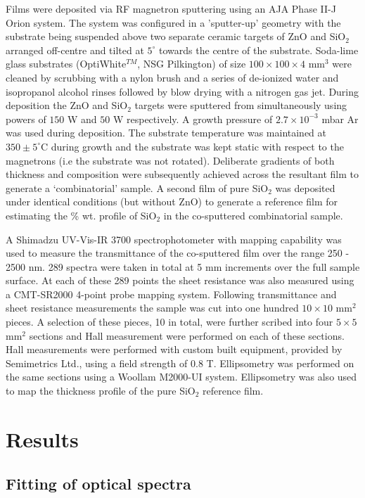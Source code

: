 \documentclass[final,5p,times]{elsarticle}
\begin{document}
Films were deposited via RF magnetron sputtering using an AJA Phase II-J Orion system. The system was configured in a 'sputter-up' geometry with the substrate being suspended above two separate ceramic targets of ZnO and SiO$_2$ arranged off-centre and tilted at $5^{\circ}$ towards the centre of the substrate.  Soda-lime glass substrates (OptiWhite$^{TM}$, NSG Pilkington) of size $100\times100\times4$ mm$^{3}$ were cleaned by scrubbing with a nylon brush and a series of de-ionized water and isopropanol alcohol rinses followed by blow drying with a nitrogen gas jet. During deposition the ZnO and SiO$_2$ targets were sputtered from simultaneously using powers of $150$ W and $50$ W respectively. A growth pressure of $2.7\times10^{-3}$ mbar Ar was used during deposition. The substrate temperature was maintained at $350\pm5^{\circ}$C during growth and the substrate was kept static with respect to the magnetrons (i.e the substrate was not rotated). Deliberate gradients of both thickness and composition were subsequently achieved across the resultant film to generate a `combinatorial' sample. A second film of pure SiO$_{2}$ was deposited under identical conditions (but without ZnO) to generate a reference film for estimating the \% wt. profile of SiO$_{2}$ in the co-sputtered combinatorial sample.

A Shimadzu UV-Vis-IR 3700 spectrophotometer with mapping capability was used to measure the transmittance of the co-sputtered film over the range 250 - 2500 nm. 289 spectra were taken in total at 5 mm increments over the full sample surface. At each of these 289 points the sheet resistance was also measured using a CMT-SR2000 4-point probe mapping system. Following transmittance and sheet resistance measurements the sample was cut into one hundred $10\times10$ mm$^2$ pieces. A selection of these pieces, 10 in total, were further scribed into four $5\times5$ mm$^2$ sections and Hall measurement were performed on each of these sections. Hall measurements were performed with custom built equipment, provided by Semimetrics Ltd., using a field strength of 0.8 T.  Ellipsometry was performed on the same sections using a Woollam M2000-UI system. Ellipsometry was also used to map the thickness profile of the pure SiO$_{2}$ reference film.

\section{Results}\label{sec:2}

\subsection{Fitting of optical spectra}\label{sec:2.1}
\end{document}
